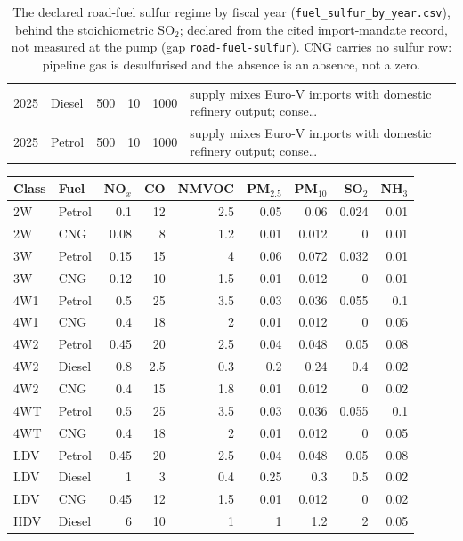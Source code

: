 \begin{table}[!htbp]
\begin{tabular}{@{}llrrrl@{}}
2025 & Diesel & 500 & 10 & 1000 & supply mixes Euro-V imports with domestic refinery output; conse\dots \\
2025 & Petrol & 500 & 10 & 1000 & supply mixes Euro-V imports with domestic refinery output; conse\dots \\
\bottomrule
\end{tabular}
\caption{The declared road-fuel sulfur regime by fiscal year
(\texttt{fuel\_sulfur\_by\_year.csv}), behind the stoichiometric SO$_2$;
declared from the cited import-mandate record, not measured at the pump
(gap \texttt{road-fuel-sulfur}). CNG carries no sulfur row: pipeline gas is
desulfurised and the absence is an absence, not a zero.}
\label{tab:s2sulfur}
\end{table}

\begin{table}[!htbp]
\centering
\scriptsize
\setlength{\tabcolsep}{3pt}
\begin{tabular}{@{}llrrrrrrr@{}}
\toprule
\textbf{Class} & \textbf{Fuel} & NO$_x$ & CO & NMVOC & PM$_{2.5}$ & PM$_{10}$ & SO$_2$ & NH$_3$ \\
\midrule
2W & Petrol & 0.1 & 12 & 2.5 & 0.05 & 0.06 & 0.024 & 0.01 \\
2W & CNG & 0.08 & 8 & 1.2 & 0.01 & 0.012 & 0 & 0.01 \\
3W & Petrol & 0.15 & 15 & 4 & 0.06 & 0.072 & 0.032 & 0.01 \\
3W & CNG & 0.12 & 10 & 1.5 & 0.01 & 0.012 & 0 & 0.01 \\
4W1 & Petrol & 0.5 & 25 & 3.5 & 0.03 & 0.036 & 0.055 & 0.1 \\
4W1 & CNG & 0.4 & 18 & 2 & 0.01 & 0.012 & 0 & 0.05 \\
4W2 & Petrol & 0.45 & 20 & 2.5 & 0.04 & 0.048 & 0.05 & 0.08 \\
4W2 & Diesel & 0.8 & 2.5 & 0.3 & 0.2 & 0.24 & 0.4 & 0.02 \\
4W2 & CNG & 0.4 & 15 & 1.8 & 0.01 & 0.012 & 0 & 0.02 \\
4WT & Petrol & 0.5 & 25 & 3.5 & 0.03 & 0.036 & 0.055 & 0.1 \\
4WT & CNG & 0.4 & 18 & 2 & 0.01 & 0.012 & 0 & 0.05 \\
LDV & Petrol & 0.45 & 20 & 2.5 & 0.04 & 0.048 & 0.05 & 0.08 \\
LDV & Diesel & 1 & 3 & 0.4 & 0.25 & 0.3 & 0.5 & 0.02 \\
LDV & CNG & 0.45 & 12 & 1.5 & 0.01 & 0.012 & 0 & 0.02 \\
HDV & Diesel & 6 & 10 & 1 & 1 & 1.2 & 2 & 0.05 \\

\end{tabular}
\end{table}
